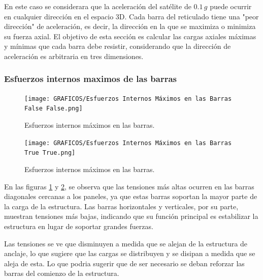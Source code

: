 En este caso se considerara que la aceleración del satélite de \(0.1 \, g\) puede ocurrir en cualquier dirección en el espacio 3D. Cada barra del reticulado tiene una "peor dirección" de aceleración, es decir, la dirección en la que se maximiza o minimiza su fuerza axial. El objetivo de esta sección es calcular las cargas axiales máximas y mínimas que cada barra debe resistir, considerando que la dirección de aceleración es arbitraria en tres dimensiones.

\subsubsection{Esfuerzos internos maximos de las barras}

\begin{figure}[H]
    \centering
    \texttt{[image: GRAFICOS/Esfuerzos Internos Máximos en las Barras False False.png]}
    \caption{Esfuerzos internos máximos en las barras.}
    \label{fig:imagen9}
\end{figure}

\begin{figure}[H]
    \centering
    \texttt{[image: GRAFICOS/Esfuerzos Internos Máximos en las Barras True True.png]}
    \caption{Esfuerzos internos máximos en las barras.}
    \label{fig:imagen99}
\end{figure}

En las figuras \ref{fig:imagen9} y \ref{fig:imagen99}, se observa que las tensiones más altas ocurren en las barras diagonales cercanas a los paneles, ya que estas barras soportan la mayor parte de la carga de la estructura. Las barras horizontales y verticales, por su parte, muestran tensiones más bajas, indicando que su función principal es estabilizar la estructura en lugar de soportar grandes fuerzas.

Las tensiones se ve que disminuyen a medida que se alejan de la estructura de anclaje, lo que sugiere que las cargas se distribuyen y se disipan a medida que se aleja de esta. Lo que podria sugerir que de ser necesario se deban reforzar las barras del comienzo de la estructura.
